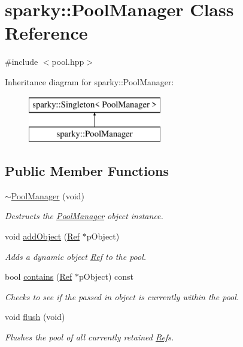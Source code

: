 \hypertarget{classsparky_1_1_pool_manager}{}\section{sparky\+:\+:Pool\+Manager Class Reference}
\label{classsparky_1_1_pool_manager}


{\ttfamily \#include $<$pool.\+hpp$>$}

Inheritance diagram for sparky\+:\+:Pool\+Manager\+:\begin{figure}[H]
\begin{center}
\leavevmode
\includegraphics[height=2.000000cm]{classsparky_1_1_pool_manager}
\end{center}
\end{figure}
\subsection*{Public Member Functions}
\begin{DoxyCompactItemize}
\item 
\hyperlink{classsparky_1_1_pool_manager_a3bd0fc1b6f4fb33613bc987ac61114af}{$\sim$\+Pool\+Manager} (void)
\begin{DoxyCompactList}\small\item\em Destructs the \hyperlink{classsparky_1_1_pool_manager}{Pool\+Manager} object instance. \end{DoxyCompactList}\item 
void \hyperlink{classsparky_1_1_pool_manager_aba8de62aa0f13d14ad68d3d26cb9549a}{add\+Object} (\hyperlink{classsparky_1_1_ref}{Ref} $\ast$p\+Object)
\begin{DoxyCompactList}\small\item\em Adds a dynamic object \hyperlink{classsparky_1_1_ref}{Ref} to the pool. \end{DoxyCompactList}\item 
bool \hyperlink{classsparky_1_1_pool_manager_a1c476a4c9d60514a86cb6c4a6e886217}{contains} (\hyperlink{classsparky_1_1_ref}{Ref} $\ast$p\+Object) const 
\begin{DoxyCompactList}\small\item\em Checks to see if the passed in object is currently within the pool. \end{DoxyCompactList}\item 
void \hyperlink{classsparky_1_1_pool_manager_a32fb836cefbcd22763895259779eea65}{flush} (void)
\begin{DoxyCompactList}\small\item\em Flushes the pool of all currently retained \hyperlink{classsparky_1_1_ref}{Ref}\textquotesingle{}s. \end{DoxyCompactList}\end{DoxyCompactItemize}
